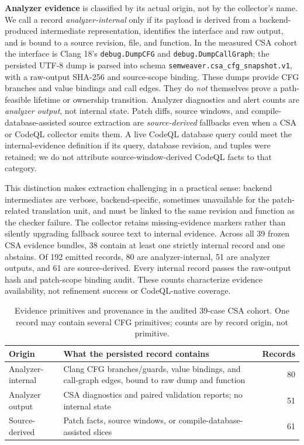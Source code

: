 \textbf{Analyzer evidence} is classified by its actual origin, not by the collector's name.  We call a record \emph{analyzer-internal} only if its payload is derived from a backend-produced intermediate representation, identifies the interface and raw output, and is bound to a source revision, file, and function.  In the measured CSA cohort the interface is Clang 18's \texttt{debug.DumpCFG} and \texttt{debug.DumpCallGraph}; the persisted UTF-8 dump is parsed into schema \texttt{semweaver.csa\_cfg\_snapshot.v1}, with a raw-output SHA-256 and source-scope binding.  These dumps provide CFG branches and value bindings and call edges.  They do \emph{not} themselves prove a path-feasible lifetime or ownership transition.  Analyzer diagnostics and alert counts are \emph{analyzer output}, not internal state.  Patch diffs, source windows, and compile-database-assisted source extraction are \emph{source-derived} fallbacks even when a CSA or CodeQL collector emits them.  A live CodeQL database query could meet the internal-evidence definition if its query, database revision, and tuples were retained; we do not attribute source-window-derived CodeQL facts to that category.

This distinction makes extraction challenging in a practical sense: backend intermediates are verbose, backend-specific, sometimes unavailable for the patch-related translation unit, and must be linked to the same revision and function as the checker failure. The collector retains missing-evidence markers rather than silently upgrading fallback source text to internal evidence. Across all 39 frozen CSA evidence bundles, 38 contain at least one strictly internal record and one abstains. Of 192 emitted records, 80 are analyzer-internal, 51 are analyzer outputs, and 61 are source-derived. Every internal record passes the raw-output hash and patch-scope binding audit. These counts characterize evidence availability, not refinement success or CodeQL-native coverage.

\begin{table}[t]
\centering\footnotesize
\setlength{\tabcolsep}{3pt}
\caption{Evidence primitives and provenance in the audited 39-case CSA cohort. One record may contain several CFG primitives; counts are by record origin, not primitive.}
\label{tab:origin-types}
\begin{tabular}{@{}p{}p{}r@{}}
\toprule
Origin & What the persisted record contains & Records \\
\midrule
Analyzer-internal & Clang CFG branches/guards, value bindings, and call-graph edges, bound to raw dump and function & 80 \\
Analyzer output & CSA diagnostics and paired validation reports; no internal state & 51 \\
Source-derived & Patch facts, source windows, or compile-database-assisted slices & 61 \\
\bottomrule
\end{tabular}
\end{table}

